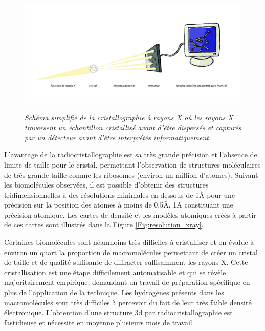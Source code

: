 \begin{figure}[htb]
  \centering
  {\includegraphics[width=0.9\linewidth]{./figures/ch1/cristallographie_x_ray.pdf}}
    \caption[Schéma simplifié de la cristallographie à rayons X.]{\it Schéma simplifié de la cristallographie à rayons X où les rayons X traversent un échantillon cristallisé avant d'être dispersés et capturés par un détecteur avant d'être interprétés informatiquement. }
    \label{Fig:cristallographie_x_ray}
  \hspace{0.2cm}
\end{figure}

L'avantage de la radiocristallographie est sa très grande précision et l'absence de limite de taille pour le cristal, permettant l'observation de structures moléculaires de très grande taille comme les ribosomes (environ un million d'atomes). 
Suivant les biomolécules observées, il est possible d'obtenir des structures tridimensionnelles à des résolutions minimales en dessous de 1\r{A} pour une précision sur la position des atomes à moins de 0.5\r{A}. 1\r{A} constituant une précision atomique. Les cartes de densité et les modèles atomiques créés à partir de ces cartes sont illustrés dans la Figure \ref{Fig:resolution_xray}.

Certaines biomolécules sont néanmoins très difficiles à cristalliser et on évalue à environ un quart la proportion de macromolécules permettant de créer un cristal de taille et de qualité suffisante de diffracter suffisamment les rayons X. Cette cristallisation est une étape difficilement automatisable et qui se révèle majoritairement empirique, demandant un travail de préparation spécifique en plus de l'application de la technique. Les hydrogènes présents dans les macromolécules sont très difficiles à percevoir du fait de leur très faible densité électronique. L'obtention d'une structure 3d par radiocristallographie est fastidieuse et nécessite en moyenne plusieurs mois de travail.

